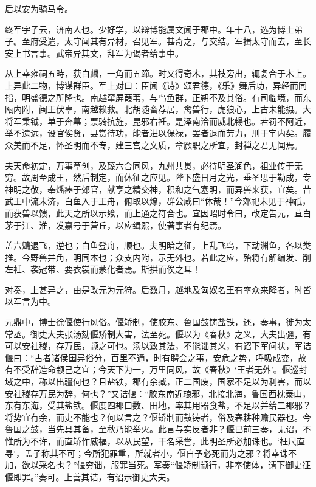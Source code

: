 \documentclass[12pt,UTF8]{ctexbook}
\begin{document}
后以安为骑马令。



终军字子云，济南人也。少好学，以辩博能属文闻于郡中。年十八，选为博士弟子。至府受遣，太守闻其有异材，召见军。甚奇之，与交结。军揖太守而去，至长安上书言事。武帝异其文，拜军为谒者给事中。



从上幸雍祠五畤，获白麟，一角而五蹄。时又得奇木，其枝旁出，辄复合于木上。上异此二物，博谋群臣。军上对曰：臣闻《诗》颂君德，《乐》舞后功，异经而同指，明盛德之所隆也。南越窜屏葭苇，与鸟鱼群，正朔不及其俗。有司临境，而东瓯内附，闽王伏辜，南越赖救。北胡随畜荐居，禽兽行，虎狼心，上古未能摄。大将军秉钺，单于奔幕；票骑抗旌，昆邪右衽。是泽南洽而威北暢也。若罚不阿近，举不遗远，设官俟贤，县赏待功，能者进以保禄，罢者退而劳力，刑于宇内矣。履众美而不足，怀圣明而不专，建三宫之文质，章厥职之所宜，封禅之君无闻焉。



夫天命初定，万事草创，及臻六合同风，九州共贯，必待明圣润色，祖业传于无穷。故周至成王，然后制定，而休征之应见。陛下盛日月之光，垂圣思于勒成，专神明之敬，奉燔瘗于郊官，献享之精交神，积和之气塞明，而异兽来获，宜矣。昔武王中流未济，白鱼入于王舟，俯取以燎，群公咸曰“休哉！”今郊祀未见于神祇，而获兽以馈，此天之所以示飨，而上通之符合也。宜因昭时令曰，改定告元，苴白茅于江、淮，发嘉号于营丘，以应缉熙，使著事者有纪焉。



盖六鶂退飞，逆也；白鱼登舟，顺也。夫明暗之征，上乱飞鸟，下动渊鱼，各以类推。今野兽并角，明同本也；众支内附，示无外也。若此之应，殆将有解编发、削左衽、袭冠带、要衣裳而蒙化者焉。斯拱而俟之耳！



对奏，上甚异之，由是改元为元狩。后数月，越地及匈奴名王有率众来降者，时皆以军言为中。



元鼎中，博士徐偃使行风俗。偃矫制，使胶东、鲁国鼓铸盐铁，还，奏事，徙为太常丞。御史大夫张汤劾偃矫制大害，法至死。偃以为《春秋》之义，大夫出疆，有可以安社稷，存万民，颛之可也。汤以致其法，不能诎其义，有诏下军问状，军诘偃曰：“古者诸侯国异俗分，百里不通，时有聘会之事，安危之势，呼吸成变，故有不受辞造命颛己之宜；今天下为一，万里同风，故《春秋》‘王者无外’。偃巡封域之中，称以出疆何也？且盐铁，郡有余臧，正二国废，国家不足以为利害，而以安社稷存万民为辞，何也？”又诘偃：“胶东南近琅邪，北接北海，鲁国西枕泰山，东有东海，受其盐铁。偃度四郡口数、田地，率其用器食盐，不足以并给二郡邪？将势宜有余，而吏不能也？何以言之？偃矫制而鼓铸者，俗及春耕种赡民器也。今鲁国之鼓，当先具其备，至秋乃能举火。此言与实反者非？偃已前三奏，无诏，不惟所为不许，而直矫作威福，以从民望，干名采誉，此明圣所必加诛也。‘枉尺直寻’，孟子称其不可；今所犯罪重，所就者小，偃自予必死而为之邪？将幸诛不加，欲以采名也？”偃穷诎，服罪当死。军奏“偃矫制颛行，非奉使体，请下御史征偃即罪。”奏可。上善其诘，有诏示御史大夫。
\end{document}
